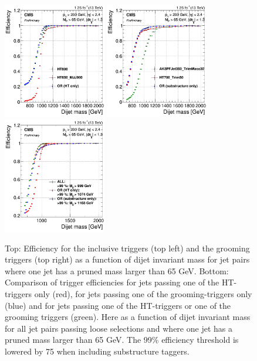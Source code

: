 \begin{figure}[h!]
\centering
\includegraphics[width=0.4\textwidth]{figures/analysis/search1/AN-15-211//triggereffMjj-HT.png}
\includegraphics[width=0.4\textwidth]{figures/analysis/search1/AN-15-211//triggereffMjj-SUBST.png}\\
\includegraphics[width=0.4\textwidth]{figures/analysis/search1/AN-15-211/triggereffMjj-ALL.png}
\caption{Top: Efficiency for the inclusive triggers (top left) and the grooming triggers (top right) as a function of dijet invariant mass for jet pairs where one jet has a pruned mass larger than 65 GeV. Bottom: Comparison of trigger efficiencies for jets passing one of the HT-triggers only (red), for jets passing one of the grooming-triggers only (blue) and for jets passing one of the HT-triggers or one of the grooming triggers (green). Here as a function of dijet invariant mass for all jet pairs passing loose selections and where one jet has a pruned mass larger than 65 GeV. The 99\% efficiency threshold is lowered by 75 \GeV when including substructure taggers.}
\label{fig:searchI:trigger-fits}
\end{figure}


